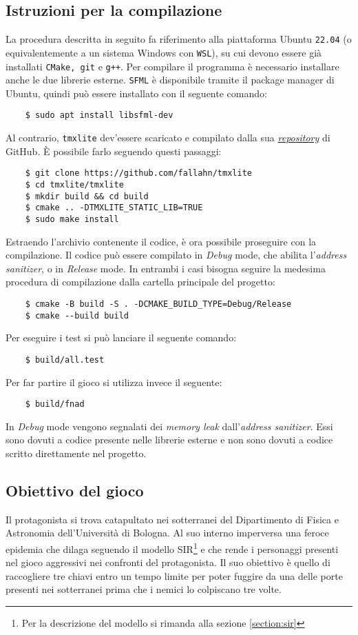 \documentclass{article}
\begin{document}
\subsection{Istruzioni per la compilazione}
La procedura descritta in seguito fa riferimento alla piattaforma Ubuntu \verb|22.04| (o equivalentemente a un sistema Windows con \verb|WSL|), su cui devono essere già installati \verb|CMake, git| e \verb|g++|. Per compilare il programma è necessario installare anche le due librerie esterne. \verb|SFML| è disponibile tramite il package manager di Ubuntu, quindi può essere installato con il seguente comando:
\begin{verbatim}
    $ sudo apt install libsfml-dev
\end{verbatim}
Al contrario, \verb|tmxlite| dev'essere scaricato e compilato dalla sua \href{https://github.com/fallahn/tmxlite}{\textit{repository}} di GitHub. È possibile farlo seguendo questi passaggi:
\begin{verbatim}
    $ git clone https://github.com/fallahn/tmxlite
    $ cd tmxlite/tmxlite
    $ mkdir build && cd build
    $ cmake .. -DTMXLITE_STATIC_LIB=TRUE
    $ sudo make install
\end{verbatim}
Estraendo l'archivio contenente il codice, è ora possibile proseguire con la compilazione. Il codice può essere compilato in \textit{Debug} mode, che abilita l'\textit{address sanitizer}, o in \textit{Release} mode. In entrambi i casi bisogna seguire la medesima procedura di compilazione dalla cartella principale del progetto:
\begin{verbatim}
    $ cmake -B build -S . -DCMAKE_BUILD_TYPE=Debug/Release
    $ cmake --build build
\end{verbatim}
Per eseguire i test si può lanciare il seguente comando:
\begin{verbatim}
    $ build/all.test
\end{verbatim}
Per far partire il gioco si utilizza invece il seguente:
\begin{verbatim}
    $ build/fnad
\end{verbatim}
In \textit{Debug} mode vengono segnalati dei \textit{memory leak} dall'\textit{address sanitizer}. Essi sono dovuti a codice presente nelle librerie esterne e non sono dovuti a codice scritto direttamente nel progetto.

\subsection{Obiettivo del gioco}
Il protagonista si trova catapultato nei sotterranei del Dipartimento di Fisica e Astronomia dell'Università di Bologna. Al suo interno imperversa una feroce epidemia che dilaga seguendo il modello SIR\footnote{Per la descrizione del modello si rimanda alla sezione \ref{section:sir}} e che rende i personaggi presenti nel gioco aggressivi nei confronti del protagonista. Il suo obiettivo è quello di raccogliere tre chiavi entro un tempo limite per poter fuggire da una delle porte presenti nei sotterranei prima che i nemici lo colpiscano tre volte.
\end{document}
